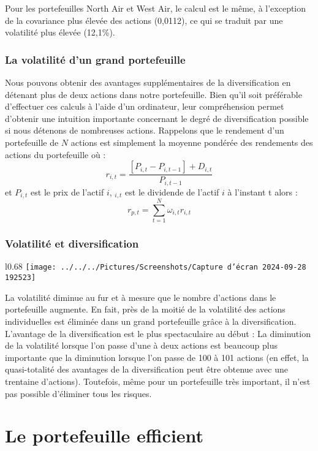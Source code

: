 \documentclass[a4paper, 12pt]{report}
\begin{document}
Pour les portefeuilles North Air et West Air, le calcul est le même, à l'exception de la covariance plus élevée des actions (0,0112), ce qui se traduit par une volatilité plus élevée (12,1\%).

\subsubsection{La volatilité d'un grand portefeuille}

Nous pouvons obtenir des avantages supplémentaires de la diversification en détenant plus de deux actions dans notre portefeuille. Bien qu'il soit préférable d'effectuer ces calculs à l'aide d'un ordinateur, leur compréhension permet d'obtenir une intuition importante concernant le degré de diversification possible si nous détenons de nombreuses actions. Rappelons que le rendement d'un portefeuille de $N$ actions est simplement la moyenne pondérée des rendements des actions du portefeuille où :
$$
r_{i,t}=\frac{[P_{i,t}-P_{i,t-1}]+D_{i,t}}{P_{i,t-1}}
$$
et $P_{i,t}$ est le prix de l'actif $i$, $_{i,t}$ est le dividende de l'actif $i$ à l'instant t alors :
$$
r_{p,t}=\sum_{t=1}^{N}\omega_{i,t}r_{i,t}
$$

\subsubsection{Volatilité et diversification}

\begin{wrapfigure}{l}{0.68\textwidth}
	\centering
\texttt{[image: ../../../Pictures/Screenshots/Capture d'écran 2024-09-28 192523]}
\end{wrapfigure}
La volatilité diminue au fur et à mesure que le nombre d'actions dans le portefeuille augmente. En fait, près de la moitié de la volatilité des actions individuelles est éliminée dans un grand portefeuille grâce à la diversification. L'avantage de la diversification est le plus spectaculaire au début : La diminution de la volatilité lorsque l'on passe d'une à deux actions est beaucoup plus importante que la diminution lorsque l'on passe de 100 à 101 actions (en effet, la quasi-totalité des avantages de la diversification peut être obtenue avec une trentaine d'actions). Toutefois, même pour un portefeuille très important, il n'est pas possible d'éliminer tous les risques.

\section{Le portefeuille efficient}
\end{document}
